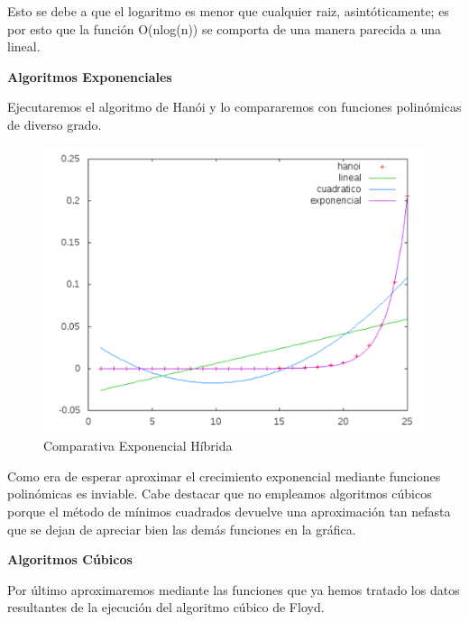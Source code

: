 \documentclass[a4paper, 11pt]{article}
\begin{document}
Esto se debe a que el logaritmo es menor que cualquier raiz, asintóticamente; es por esto que la función O(nlog(n)) se comporta de una manera parecida a una lineal.


\vspace{1cm}

\textbf{Algoritmos Exponenciales}

Ejecutaremos el algoritmo de Hanói y lo compararemos con funciones polinómicas de diverso grado.

\begin{figure}[H]\includegraphics[width=13cm]{img/expo_hibrida2.pdf} \centering
	\caption{Comparativa Exponencial Híbrida}\end{figure}

Como era de esperar aproximar el crecimiento exponencial mediante funciones polinómicas es inviable. Cabe destacar que no empleamos algoritmos cúbicos porque el método de mínimos cuadrados devuelve una aproximación tan nefasta que se dejan de apreciar bien las demás funciones en la gráfica.

\vspace{1cm}

\textbf{Algoritmos Cúbicos}

Por último aproximaremos mediante las funciones que ya hemos tratado los datos resultantes de la ejecución del algoritmo cúbico de Floyd.
\end{document}
